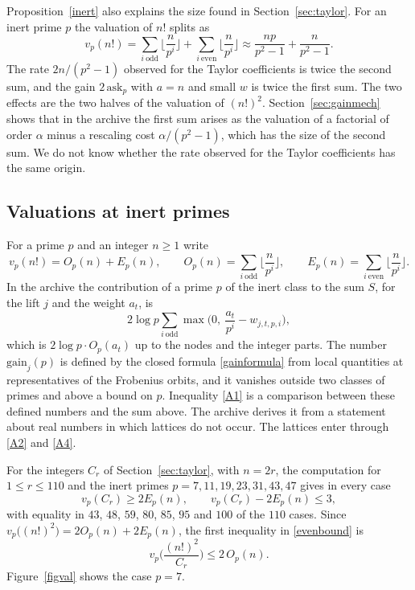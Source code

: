 \documentclass[11pt,letterpaper]{article}
\numberwithin{equation}{section}
\begin{document}
Proposition~\ref{inert} also explains the size found in Section~\ref{sec:taylor}. For an inert prime $p$ the valuation of $n!$ splits as
\[
v_p(n!)=\sum_{i\ \mathrm{odd}}\Big\lfloor\frac n{p^i}\Big\rfloor+\sum_{i\ \mathrm{even}}\Big\lfloor\frac n{p^i}\Big\rfloor\approx\frac{np}{p^2-1}+\frac n{p^2-1}.
\]
The rate $2n/(p^2-1)$ observed for the Taylor coefficients is twice the second sum, and the gain $2\,\mathrm{ask}_p$ with $a=n$ and small $w$ is twice the first sum. The two effects are the two halves of the valuation of $(n!)^2$. Section~\ref{sec:gainmech} shows that in the archive the first sum arises as the valuation of a factorial of order $\alpha$ minus a rescaling cost $\alpha/(p^2-1)$, which has the size of the second sum. We do not know whether the rate observed for the Taylor coefficients has the same origin.

\subsection{Valuations at inert primes}\label{sec:val}

For a prime $p$ and an integer $n\ge1$ write
\[
v_p(n!)=O_p(n)+E_p(n),\qquad O_p(n)=\sum_{i\ \mathrm{odd}}\Big\lfloor\frac n{p^i}\Big\rfloor,\qquad E_p(n)=\sum_{i\ \mathrm{even}}\Big\lfloor\frac n{p^i}\Big\rfloor .
\]
In the archive the contribution of a prime $p$ of the inert class to the sum $S$, for the lift $j$ and the weight $a_t$, is
\[
2\log p\sum_{i\ \mathrm{odd}}\max\Big(0,\ \frac{a_t}{p^i}-w_{j,t,p,i}\Big),
\]
which is $2\log p\cdot O_p(a_t)$ up to the nodes and the integer parts. The number $\mathrm{gain}_j(p)$ is defined by the closed formula \eqref{gainformula} from local quantities at representatives of the Frobenius orbits, and it vanishes outside two classes of primes and above a bound on $p$. Inequality \eqref{A1} is a comparison between these defined numbers and the sum above. The archive derives it from a statement about real numbers in which lattices do not occur. The lattices enter through \eqref{A2} and \eqref{A4}.

For the integers $C_r$ of Section~\ref{sec:taylor}, with $n=2r$, the computation for $1\le r\le110$ and the inert primes $p=7,11,19,23,31,43,47$ gives in every case
\begin{equation}\label{evenbound}
v_p(C_r)\ge2E_p(n),\qquad v_p(C_r)-2E_p(n)\le3 ,
\end{equation}
with equality in $43$, $48$, $59$, $80$, $85$, $95$ and $100$ of the $110$ cases. Since $v_p\big((n!)^2\big)=2O_p(n)+2E_p(n)$, the first inequality in \eqref{evenbound} is
\[
v_p\Big(\frac{(n!)^2}{C_r}\Big)\le2\,O_p(n).
\]
Figure~\ref{figval} shows the case $p=7$.
\end{document}
